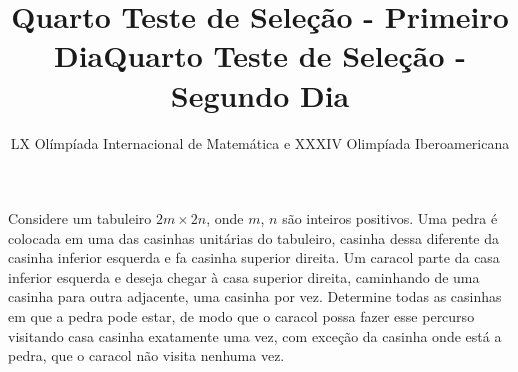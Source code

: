 \documentclass[10pt,a4paper]{article}
\title{Quarto Teste de Seleção - Primeiro Dia}
\author{\small LX Olímpíada Internacional de Matemática e  XXXIV Olimpíada Iberoamericana}
\begin{document}
\zeustitle


\newpage

\title{Quarto Teste de Seleção - Segundo Dia}

\zeustitle

\begin{prob}
	Considere um tabuleiro $2m \times 2n$, onde $m$, $n$ são inteiros positivos. Uma pedra é colocada em uma das casinhas unitárias do tabuleiro, casinha dessa diferente da casinha inferior esquerda e fa casinha superior direita. Um caracol parte da casa inferior esquerda e deseja chegar à casa superior direita, caminhando de uma casinha para outra adjacente, uma casinha por vez. Determine todas as casinhas em que a pedra pode estar, de modo que o caracol possa fazer esse percurso visitando casa casinha exatamente uma vez, com exceção da casinha onde está a pedra, que o caracol não visita nenhuma vez.
\end{prob}
\end{document}
